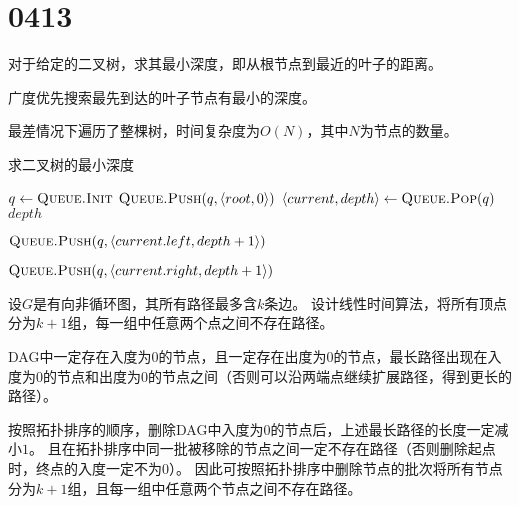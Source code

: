 \section{0413}\label{sec:0413}
\begin{questions}\label{qset:0413}

    \question 对于给定的二叉树，求其最小深度，即从根节点到最近的叶子的距离。

    \begin{solution}
        广度优先搜索最先到达的叶子节点有最小的深度。

        最差情况下遍历了整棵树，时间复杂度为$O(N)$，其中$N$为节点的数量。

        \begin{algorithm}[H]
            \caption{求二叉树的最小深度} \label{alg:0413:01}
            \begin{algorithmic}[1]
                \State $q \gets \Call{Queue.Init}{}$
                \State $\Call{Queue.Push}{q, \langle root, 0 \rangle}$
                \State $\langle current, depth \rangle \gets \Call{Queue.Pop}{q}$
                 
                \State \Return $depth$ 
                \EndIf

                 
                \State $\Call{Queue.Push}{q, \langle current.left, depth+1 \rangle}$
                \EndIf

                 
                \State $\Call{Queue.Push}{q, \langle current.right, depth+1 \rangle}$
                \EndIf
                \EndWhile
            \end{algorithmic}
        \end{algorithm}
    \end{solution}


    \question 设$G$是有向非循环图，其所有路径最多含$k$条边。
    设计线性时间算法，将所有顶点分为$k+1$组，每一组中任意两个点之间不存在路径。

    \begin{solution}
        DAG中一定存在入度为$0$的节点，且一定存在出度为$0$的节点，最长路径出现在入度为$0$的节点和出度为$0$的节点之间（否则可以沿两端点继续扩展路径，得到更长的路径）。

        按照拓扑排序的顺序，删除DAG中入度为$0$的节点后，上述最长路径的长度一定减小$1$。
        且在拓扑排序中同一批被移除的节点之间一定不存在路径（否则删除起点时，终点的入度一定不为0）。
        因此可按照拓扑排序中删除节点的批次将所有节点分为$k+1$组，且每一组中任意两个节点之间不存在路径。


\end{solution}
\end{questions}
